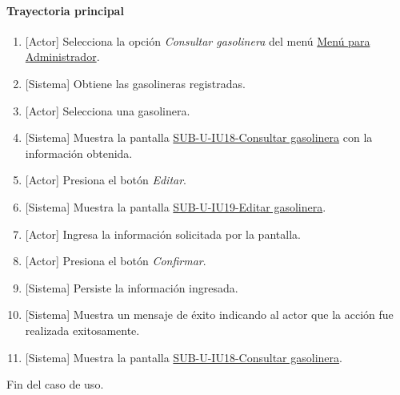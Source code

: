 \paragraph{Trayectoria principal}
	\begin{enumerate}
		\item {[Actor]} Selecciona la opción \textit{Consultar gasolinera} del menú \hyperref[fig:menu-admi]{Menú para Administrador}.
		\item {[Sistema]} Obtiene las gasolineras registradas.
		\item {[Actor]} Selecciona una gasolinera.
		\item {[Sistema]} Muestra la pantalla \hyperref[fig:sub-u-iu18]{SUB-U-IU18-Consultar gasolinera} con la información obtenida.
		\item {[Actor]} Presiona el botón \textit{Editar}.
		\item {[Sistema]} Muestra la pantalla \hyperref[fig:sub-u-iu19]{SUB-U-IU19-Editar gasolinera}.
		\item {[Actor]} Ingresa la información solicitada por la pantalla.
		\item {[Actor]} Presiona el botón \textit{Confirmar}.
		\item {[Sistema]} Persiste la información ingresada.
		\item {[Sistema]} Muestra un mensaje de éxito indicando al actor que la acción fue realizada exitosamente.
		\item \label{SUB-U-CU19:Pantalla} {[Sistema]} Muestra la pantalla \hyperref[fig:sub-u-iu18]{SUB-U-IU18-Consultar gasolinera}.
	\end{enumerate}
	Fin del caso de uso.

